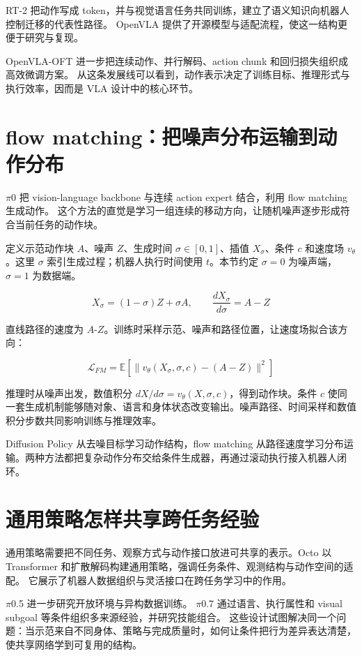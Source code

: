 \documentclass[UTF8,a4paper,11pt,oneside,openany,fontset=none]{ctexbook}
\begin{document}
RT-2 把动作写成 token，并与视觉语言任务共同训练，建立了语义知识向机器人控制迁移的代表性路径。\cite{R06} OpenVLA 提供了开源模型与适配流程，使这一结构更便于研究与复现。\cite{R07}

OpenVLA-OFT 进一步把连续动作、并行解码、action chunk 和回归损失组织成高效微调方案。\cite{R08} 从这条发展线可以看到，动作表示决定了训练目标、推理形式与执行效率，因而是 VLA 设计中的核心环节。

\section{flow matching：把噪声分布运输到动作分布}\label{flow-matchingux628aux566aux58f0ux5206ux5e03ux8fd0ux8f93ux5230ux52a8ux4f5cux5206ux5e03}

\(\pi\)0 把 vision-language backbone 与连续 action expert 结合，利用 flow matching 生成动作。\cite{R09} 这个方法的直觉是学习一组连续的移动方向，让随机噪声逐步形成符合当前任务的动作块。

定义示范动作块 \(A\)、噪声 \(Z\)、生成时间 \(\sigma\in[0,1]\)、插值 \(X_{\sigma }\)、条件 \(c\) 和速度场 \(v_{\theta }\)。这里 \(\sigma\) 索引生成过程；机器人执行时间使用 \(t\)。本节约定 \(\sigma=0\) 为噪声端，\(\sigma=1\) 为数据端。

\[
X_\sigma=(1-\sigma)Z+\sigma A,\qquad \frac{dX_\sigma}{d\sigma}=A-Z
\]

直线路径的速度为 \(A\)-\(Z\)。训练时采样示范、噪声和路径位置，让速度场拟合该方向：

\[
\mathcal L_{FM}=\mathbb E\left[\|v_\theta(X_\sigma,\sigma,c)-(A-Z)\|^2\right]
\]

推理时从噪声出发，数值积分 \(dX/d\sigma=v_\theta(X,\sigma,c)\)，得到动作块。条件 \(c\) 使同一套生成机制能够随对象、语言和身体状态改变输出。噪声路径、时间采样和数值积分步数共同影响训练与推理效率。

Diffusion Policy 从去噪目标学习动作结构，flow matching 从路径速度学习分布运输。两种方法都把复杂动作分布交给条件生成器，再通过滚动执行接入机器人闭环。

\section{通用策略怎样共享跨任务经验}

通用策略需要把不同任务、观察方式与动作接口放进可共享的表示。Octo 以 Transformer 和扩散解码构建通用策略，强调任务条件、观测结构与动作空间的适配。\cite{R10} 它展示了机器人数据组织与灵活接口在跨任务学习中的作用。

\(\pi\)0.5 进一步研究开放环境与异构数据训练。\cite{R11} \(\pi\)0.7 通过语言、执行属性和 visual subgoal 等条件组织多来源经验，并研究技能组合。\cite{R12} 这些设计试图解决同一个问题：当示范来自不同身体、策略与完成质量时，如何让条件把行为差异表达清楚，使共享网络学到可复用的结构。
\end{document}
